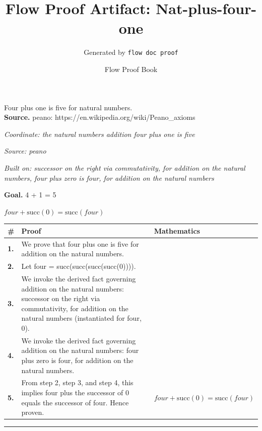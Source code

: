\documentclass[11pt]{article}
\title{Flow Proof Artifact: Nat-plus-four-one}
\author{Generated by \texttt{flow doc proof}}
\date{Flow Proof Book}
\theoremstyle{definition}
\begin{document}
\maketitle
Four plus one is five for natural numbers.\\[0.5em]
\textbf{Source.} peano: https://en.wikipedia.org/wiki/Peano\_axioms\\[0.5em]
\bigskip
{}\par
\smallskip\noindent\textit{Coordinate: the natural numbers \cdot addition \cdot four plus one is five}\par
\smallskip\noindent\textit{Source: peano}\par
\smallskip\noindent\textit{Built on: successor on the right via commutativity, for addition on the natural numbers, four plus zero is four, for addition on the natural numbers}\par
\medskip
\noindent\textbf{Goal.} 4 + 1 = 5\par
\noindent$\displaystyle four + \mathrm{succ}(0) = \mathrm{succ}(four)$\par
\medskip
\noindent
\begin{tabular}{@{} >{\raggedright\arraybackslash}p{} >{\raggedright\arraybackslash}p{} >{\raggedleft\arraybackslash}p{} @{}}
\textbf{\#} & \textbf{Proof} & \textbf{Mathematics} \\
\midrule
\textbf{1.} & We prove that four plus one is five for addition on the natural numbers. & \\[0.45em]
\textbf{2.} & Let four = succ(succ(succ(succ(0)))). & \\[0.45em]
\textbf{3.} & We invoke the derived fact governing addition on the natural numbers: successor on the right via commutativity, for addition on the natural numbers (instantiated for four, 0). & \\[0.45em]
\textbf{4.} & We invoke the derived fact governing addition on the natural numbers: four plus zero is four, for addition on the natural numbers. & \\[0.45em]
\textbf{5.} & From step 2, step 3, and step 4, this implies four plus the successor of 0 equals the successor of four. Hence proven. & $\displaystyle four + \mathrm{succ}(0) = \mathrm{succ}(four)$ \\[0.45em]
\bottomrule
\end{tabular}
\label{thm:Nat-addition-four_plus_one_is_five}
\par\medskip\hrule
\end{document}
